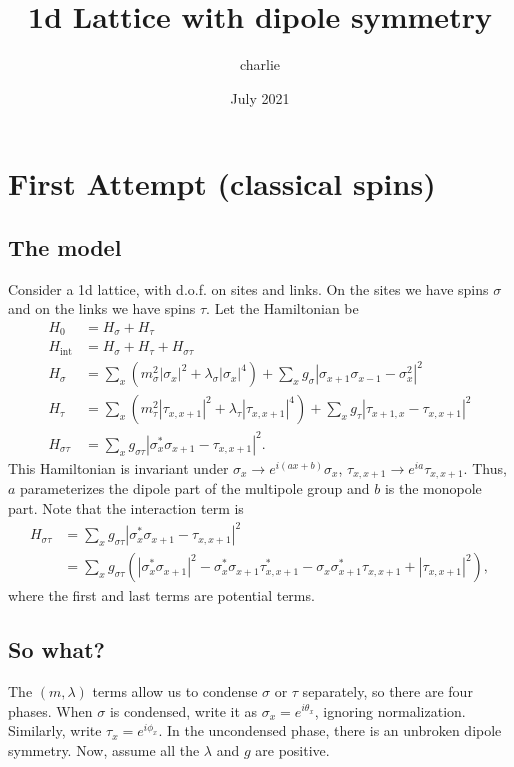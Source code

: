 \documentclass[12pt]{article}
\title{1d Lattice with dipole symmetry}
\author{charlie}
\date{July 2021}
\newcommand{\nn}{\nonumber\\}
\newcommand{\goesto}{\rightarrow}
\renewcommand{\int}{\text{int}}
\begin{document}
\maketitle

\section{First Attempt (classical spins)}

\subsection{The model}

Consider a 1d lattice, with d.o.f. on sites and links. On the sites we have spins $\sigma$ and on the links we have spins $\tau$.
Let the Hamiltonian be
\begin{align}
H_0 &= H_\sigma + H_\tau \nn
H_\int &= H_\sigma + H_\tau + H_{\sigma\tau}\nn
H_\sigma &= \sum_x \left( m_\sigma^2 |\sigma_x|^2 + \lambda_\sigma|\sigma_x|^4 \right) + \sum_x g_\sigma  \left| \sigma_{x+1}\sigma_{x-1} - \sigma_x^2 \right|^2\nn
H_\tau &= \sum_x \left( m_\tau^2 |\tau_{x,x+1}|^2 + \lambda_\tau|\tau_{x,x+1}|^4 \right) + \sum_x g_\tau \left| \tau_{x+1,x} - \tau_{x,x+1}\right|^2 \nn
H_{\sigma\tau} &= \sum_x g_{\sigma\tau} \left| \sigma_x^*\sigma_{x+1} - \tau_{x,x+1} \right|^2.
\end{align}
This Hamiltonian is invariant under $\sigma_x \goesto e^{i(ax+b)}\sigma_x$, $\tau_{x,x+1} \goesto e^{ia}\tau_{x,x+1}$. Thus, $a$ parameterizes the dipole part of the multipole group and $b$ is the monopole part. Note that the interaction term is
\begin{align}
H_{\sigma\tau} &= \sum_x g_{\sigma\tau} \left| \sigma_x^*\sigma_{x+1} - \tau_{x,x+1} \right|^2\nn
&= \sum_x g_{\sigma\tau} \left(| \sigma_x^*\sigma_{x+1} |^2 - \sigma_x^*\sigma_{x+1}\tau_{x,x+1}^* - \sigma_x\sigma_{x+1}^*\tau_{x,x+1} + |\tau_{x,x+1} |^2 \right),
\end{align}
where the first and last terms are potential terms.

\subsection{So what?}

The $(m,\lambda)$ terms allow us to condense $\sigma$ or $\tau$ separately, so there are four phases. When $\sigma$ is condensed, write it as $\sigma_x = e^{i\theta_x}$, ignoring normalization. Similarly, write $\tau_x = e^{i\phi_x}$. In the uncondensed phase, there is an unbroken dipole symmetry. Now, assume all the $\lambda$ and $g$ are positive.
\end{document}
